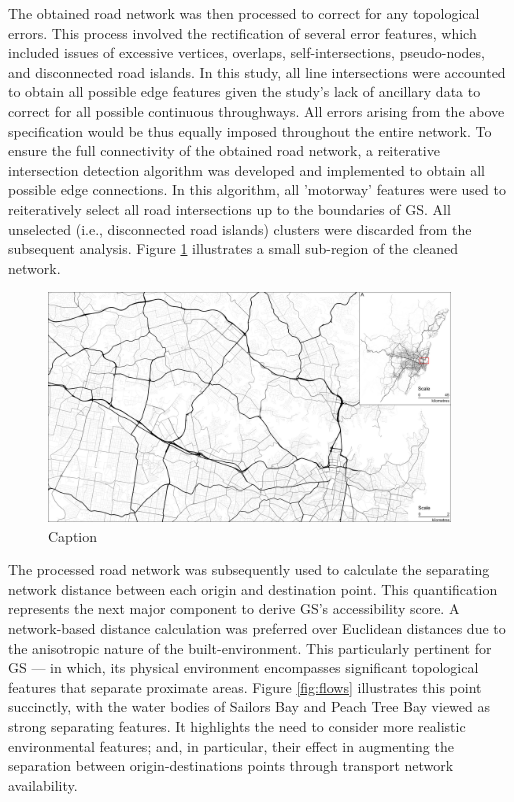 The obtained road network was then processed to correct for any  topological errors. This process involved the rectification of several error features, which included issues of excessive vertices, overlaps, self-intersections, pseudo-nodes, and disconnected road islands. In this study, all line intersections were accounted to obtain all possible edge features given the study's lack of ancillary data to correct for all possible continuous throughways. All errors arising from the above specification would be thus equally imposed throughout the entire network. To ensure the full connectivity of the obtained road network, a reiterative intersection detection algorithm was developed and implemented to obtain all possible edge connections. In this algorithm, all 'motorway' features were used to reiteratively select all road intersections up to the boundaries of GS. All unselected (i.e., disconnected road islands) clusters were discarded from the subsequent analysis. Figure \ref{fig:cleaned_road} illustrates a small sub-region of the cleaned network.\\

\begin{figure}[!ht]
    \centering
    \includegraphics[width=0.95\textwidth]{body/figures/road.png}
    \caption{Caption}
    \label{fig:cleaned_road}
\end{figure}

The processed road network was subsequently used to calculate the separating network distance between each origin and destination point. This quantification represents the next major component to derive GS's accessibility score. A network-based distance calculation was preferred over Euclidean distances due to the anisotropic nature of the built-environment. This particularly pertinent for GS --- in which, its physical environment encompasses significant topological features that separate proximate areas. Figure \ref{fig:flows} illustrates this point succinctly, with the water bodies of Sailors Bay and Peach Tree Bay viewed as strong separating features. It highlights the need to consider more realistic environmental features; and, in particular, their effect in augmenting the separation between origin-destinations points through transport network availability.\\

